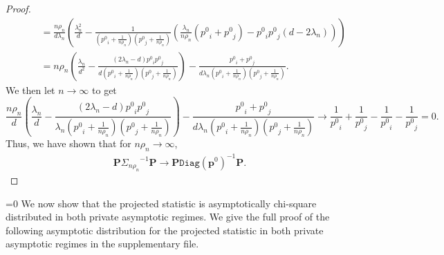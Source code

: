 \documentclass[twoside,letterpaper]{article} \usepackage{aistats2017}
\theoremstyle{definition}
\theoremstyle{remark}
\begin{document}
\begin{proof}
\begin{align*}
& \qquad = \frac{n \rho_n}{d \lambda_n} \left(\frac{\lambda_n^2}{d} - \frac{1}{({p^0}_i+\frac{1}{n\rho_n})({p^0}_j + \frac{1}{n \rho_n})} \left( \frac{\lambda_n}{n \rho_n}({p^0}_i +{p^0}_j) - {p^0}_i{p^0}_j (d - 2 \lambda_n) \right) \right) \\
& \qquad = n \rho_n \left(\frac{\lambda_n}{d^2} - \frac{(2\lambda_n - d){p^0}_i{p^0}_j}{d({p^0}_i+\frac{1}{n\rho_n})({p^0}_j + \frac{1}{n \rho_n})} \right) - \frac{{p^0}_i + {p^0}_j}{d \lambda_n({p^0}_i+\frac{1}{n\rho_n})({p^0}_j + \frac{1}{n \rho_n})}.
\end{align*}
We then let $n \to \infty$ to get
$$
\frac{n \rho_n}{d} \left(\frac{\lambda_n}{d} - \frac{(2\lambda_n - d){p^0}_i{p^0}_j}{\lambda_n({p^0}_i+\frac{1}{n\rho_n})({p^0}_j + \frac{1}{n \rho_n})} \right) - \frac{{p^0}_i + {p^0}_j}{d \lambda_n({p^0}_i+\frac{1}{n\rho_n})({p^0}_j + \frac{1}{n \rho_n})} \to \frac{1}{{p^0}_i} + \frac{1}{{p^0}_j} - \frac{1}{{p^0}_i} - \frac{1}{{p^0}_j} = 0.
$$
Thus, we have shown that for $n \rho_n \to \infty$,
\begin{align*}
{\pmb{P}} {{\Sigma}_{{n \rho_n }}}^{-1} {\pmb{P}} \to {\pmb{P}} {\ensuremath{\mathtt{Diag}}}\left( {{\mathbf{p}}^0} \right)^{-1} {\pmb{P}}.
\end{align*}

\end{proof}
\fi

=0 We now show that the projected statistic is asymptotically chi-square distributed in both private asymptotic regimes.
\else We give the full proof of the following asymptotic distribution for the projected statistic in both private asymptotic regimes in the supplementary file. 
\fi
\end{document}
